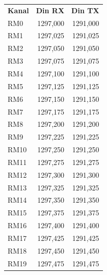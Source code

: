 \begin{tabular}{lrr}
	\textbf{Kanal} & \textbf{Din RX} & \textbf{Din TX} \\
	RM0            &        1297,000 &        1291,000 \\
	RM1            &        1297,025 &        1291,025 \\
	RM2            &        1297,050 &        1291,050 \\
	RM3            &        1297,075 &        1291,075 \\
	RM4            &        1297,100 &        1291,100 \\
	RM5            &        1297,125 &        1291,125 \\
	RM6            &        1297,150 &        1291,150 \\
	RM7            &        1297,175 &        1291,175 \\
	RM8            &        1297,200 &        1291,200 \\
	RM9            &        1297,225 &        1291,225 \\
	RM10           &        1297,250 &        1291,250 \\
	RM11           &        1297,275 &        1291,275 \\
	RM12           &        1297,300 &        1291,300 \\
	RM13           &        1297,325 &        1291,325 \\
	RM14           &        1297,350 &        1291,350 \\
	RM15           &        1297,375 &        1291,375 \\
	RM16           &        1297,400 &        1291,400 \\
	RM17           &        1297,425 &        1291,425 \\
	RM18           &        1297,450 &        1291,450 \\
	RM19           &        1297,475 &        1291,475
\end{tabular}


